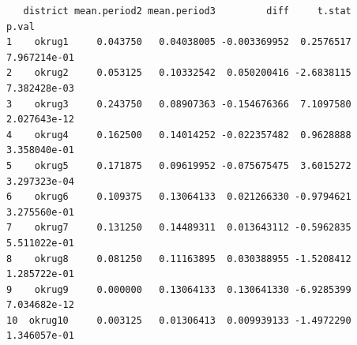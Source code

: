 \documentclass[
  letterpaper,
  DIV=11,
  numbers=noendperiod]{scrartcl}
\newenvironment{Shaded}{\begin{snugshade}}{\end{snugshade}}
\newcommand{\AttributeTok}[1]{\textcolor[rgb]{0.40,0.45,0.13}{#1}}
\newcommand{\ConstantTok}[1]{\textcolor[rgb]{0.56,0.35,0.01}{#1}}
\newcommand{\ControlFlowTok}[1]{\textcolor[rgb]{0.00,0.23,0.31}{\textbf{#1}}}
\newcommand{\DecValTok}[1]{\textcolor[rgb]{0.68,0.00,0.00}{#1}}
\newcommand{\FloatTok}[1]{\textcolor[rgb]{0.68,0.00,0.00}{#1}}
\newcommand{\FunctionTok}[1]{\textcolor[rgb]{0.28,0.35,0.67}{#1}}
\newcommand{\NormalTok}[1]{\textcolor[rgb]{0.00,0.23,0.31}{#1}}
\newcommand{\OtherTok}[1]{\textcolor[rgb]{0.00,0.23,0.31}{#1}}
\newcommand{\SpecialCharTok}[1]{\textcolor[rgb]{0.37,0.37,0.37}{#1}}
\newcommand{\StringTok}[1]{\textcolor[rgb]{0.13,0.47,0.30}{#1}}
\begin{document}
\begin{Shaded}
\end{Shaded}

\begin{verbatim}
   district mean.period2 mean.period3         diff     t.stat        p.val
1    okrug1     0.043750   0.04038005 -0.003369952  0.2576517 7.967214e-01
2    okrug2     0.053125   0.10332542  0.050200416 -2.6838115 7.382428e-03
3    okrug3     0.243750   0.08907363 -0.154676366  7.1097580 2.027643e-12
4    okrug4     0.162500   0.14014252 -0.022357482  0.9628888 3.358040e-01
5    okrug5     0.171875   0.09619952 -0.075675475  3.6015272 3.297323e-04
6    okrug6     0.109375   0.13064133  0.021266330 -0.9794621 3.275560e-01
7    okrug7     0.131250   0.14489311  0.013643112 -0.5962835 5.511022e-01
8    okrug8     0.081250   0.11163895  0.030388955 -1.5208412 1.285722e-01
9    okrug9     0.000000   0.13064133  0.130641330 -6.9285399 7.034682e-12
10  okrug10     0.003125   0.01306413  0.009939133 -1.4972290 1.346057e-01
\end{verbatim}
\end{document}
